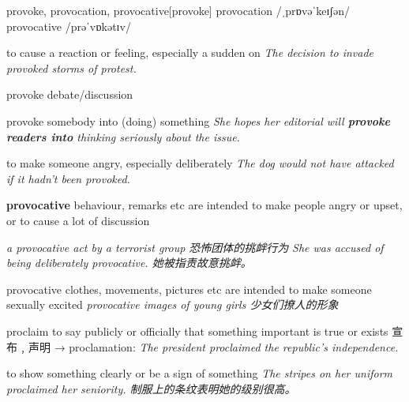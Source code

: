 \begin{DefWord}{provoke, provocation, provocative}[provoke]
    provocation /ˌprɒvəˈkeɪʃən/ provocative /prəˈvɒkətɪv/


    to cause a reaction or feeling, especially a sudden on
    \textit{The decision to invade provoked storms of protest.}

    provoke debate/discussion

    provoke somebody into (doing) something
    \textit{She hopes her editorial will \textbf{provoke readers into} thinking seriously about the issue.}

    to make someone angry, especially deliberately
    \textit{The dog would not have attacked if it hadn’t been provoked.}

    \textbf{provocative}  behaviour, remarks etc are intended to make people angry or upset, or to cause a lot of discussion

    \textit{a provocative act by a terrorist group 恐怖团体的挑衅行为}
    \textit{She was accused of being deliberately provocative. 她被指责故意挑衅。}

    provocative clothes, movements, pictures etc are intended to make someone sexually excited
    \textit{provocative images of young girls 少女们撩人的形象}
\end{DefWord}

\begin{DefWord}{proclaim}
    to say publicly or officially that something important is true or exists 宣布﹐声明 → proclamation:
    \textit{The president proclaimed the republic’s independence.}

    to show something clearly or be a sign of something
    \textit{The stripes on her uniform proclaimed her seniority. 制服上的条纹表明她的级别很高。}

\end{DefWord}